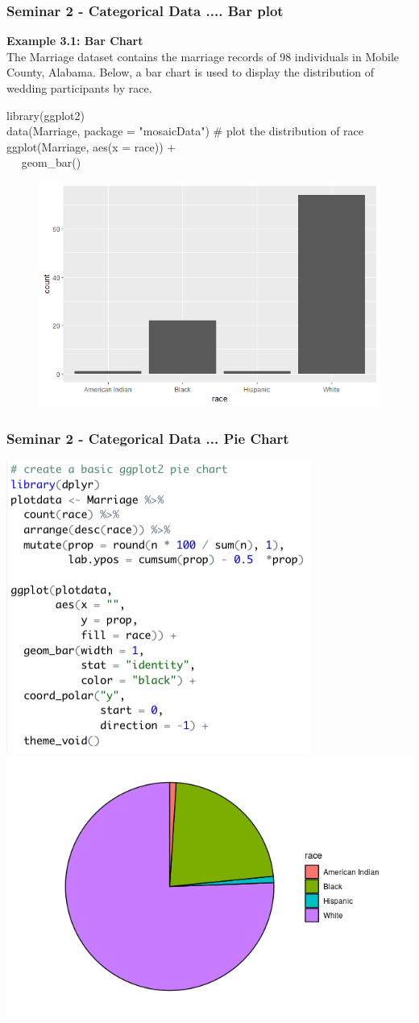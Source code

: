 \documentclass{beamer}
\begin{document}
\begin{frame}
\frametitle{Seminar 2 - Categorical Data .... Bar plot}

\textbf{Example 3.1: Bar Chart}\\
The Marriage dataset contains the marriage records of 98 individuals in Mobile County, Alabama. Below, a bar chart is used to display the distribution of wedding participants by race.\newline 

\footnotesize
library(ggplot2)\\
data(Marriage, package = "mosaicData")\newline 
\# plot the distribution of race\\
ggplot(Marriage, aes(x = race)) + \\
\textcolor{white}{---} geom\_bar()\\
\begin{figure}
\includegraphics[width=0.4\linewidth]{Seminar_2_images/R/b Bar Charts.png}
\end{figure}
\end{frame}
\begin{frame}
\frametitle{Seminar 2 - Categorical Data ... Pie Chart}
\begin{example} 
\includegraphics[width=0.4\linewidth]{Seminar_2_images/R/b pie_char_code.png}
\includegraphics[width=0.59\linewidth]{Seminar_2_images/R/b pie-char.png}
\end{example}
\end{frame}
\end{document}
